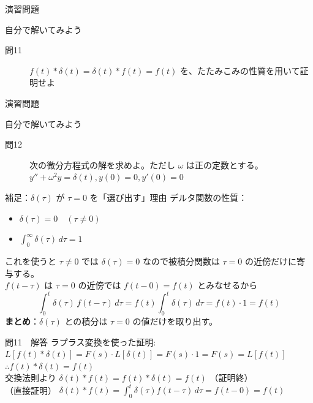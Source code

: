 \documentclass[professionalfonts]{beamer}
\begin{document}
\begin{frame}{演習問題}
  \begin{exampleblock}{自分で解いてみよう}
  \begin{description}
    \item[問11] $f(t)*\delta(t) = \delta(t)*f(t) = f(t)$ を、たたみこみの性質を用いて証明せよ
  \end{description}
  \end{exampleblock}
\end{frame}

\begin{frame}{演習問題}
  \begin{exampleblock}{自分で解いてみよう}
  \begin{description}
    \item[問12] 次の微分方程式の解を求めよ。ただし $\omega$ は正の定数とする。
    $y'' + \omega^{2}y = \delta(t),  y(0) = 0,  y'(0) = 0$\\
  \end{description}
  \end{exampleblock}
\end{frame}

\begin{frame}{補足：$\delta(\tau)$ が $\tau=0$ を「選び出す」理由}
  デルタ関数の性質：
  \begin{itemize}
    \item $\delta(\tau) = 0 \quad (\tau \neq 0)$
    \item $\displaystyle\int_{0}^{\infty} \delta(\tau)\,d\tau = 1$
  \end{itemize}
  \vspace{6pt}
  これを使うと $\tau\neq 0$ では $\delta(\tau)=0$ なので被積分関数は $\tau=0$ の近傍だけに寄与する。\\[6pt]
  $f(t-\tau)$ は $\tau=0$ の近傍では $f(t-0)=f(t)$ とみなせるから
  \[
    \int_{0}^{t} \delta(\tau)\,f(t-\tau)\,d\tau
    = f(t)\int_{0}^{t} \delta(\tau)\,d\tau = f(t)\cdot 1 = f(t)
  \]
  \textbf{まとめ}：$\delta(\tau)$ との積分は $\tau=0$ の値だけを取り出す。
\end{frame}

\begin{frame}{問11　解答}
  ラプラス変換を使った証明:\\[4pt]
  $L[f(t)*\delta(t)] = F(s)\cdot L[\delta(t)] = F(s)\cdot1 = F(s) = L[f(t)]$\\[4pt]
  $\therefore f(t)*\delta(t) = f(t)$\\[4pt]
  交換法則より $\delta(t)*f(t) = f(t)*\delta(t) = f(t)$ （証明終）\\[4pt]
  （直接証明） $\delta(t)*f(t) = \int_{0}^t \delta(\tau)f(t-\tau)\, d\tau = f(t-0) = f(t)$
\end{frame}
\end{document}
